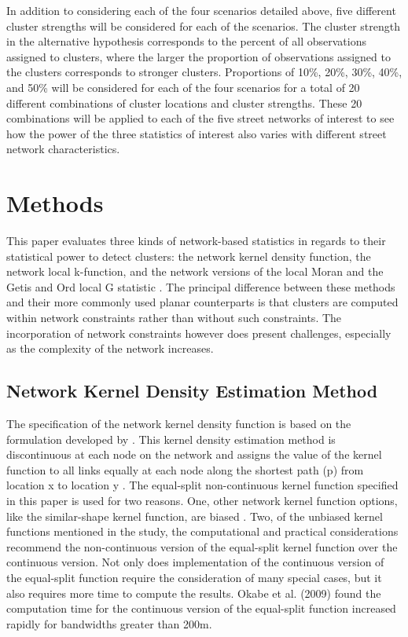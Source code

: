 \documentclass[12pt, letterpaper]{article}
\begin{document}
In addition to considering each of the four scenarios detailed above, five different cluster strengths will be considered for each of the scenarios. The cluster strength in the alternative hypothesis corresponds to the percent of all observations assigned to clusters, where the larger the proportion of observations assigned to the clusters corresponds to stronger clusters. Proportions of 10\%, 20\%, 30\%, 40\%, and 50\% will be considered for each of the four scenarios for a total of 20 different combinations of cluster locations and cluster strengths. These 20 combinations will be applied to each of the five street networks of interest to see how the power of the three statistics of interest also varies with different street network characteristics.  


\section{Methods}
This paper evaluates three kinds of network-based statistics in regards to their statistical power to detect clusters: the network kernel density function, the network local k-function, and the network versions of the local Moran \citep{Anselin 1995} and the Getis and Ord local G statistic \citep{getisord1992distance}. The principal difference between these methods and their more commonly used planar counterparts is that clusters are computed within network constraints rather than without such constraints. The incorporation of network constraints however does present challenges, especially as the complexity of the network increases. 

\subsection{Network Kernel Density Estimation Method}
The specification of the network kernel density function is based on the formulation developed by  \citep{okabe2009kernel}. This kernel density estimation method is discontinuous at each node on the network and assigns the value of the kernel function to all links equally at each node along the shortest path (p) from location x to location y \citep{okabe2009kernel}. The equal-split non-continuous kernel function specified in this paper is used for two reasons. One, other network kernel function options, like the similar-shape kernel function, are biased \citep{okabe2009kernel}. Two, of the unbiased kernel functions mentioned in the study, the computational and practical considerations recommend the non-continuous version of the equal-split kernel function over the continuous version. Not only does implementation of the continuous version of the equal-split function require the consideration of many special cases, but it also requires more time to compute the results. Okabe et al. (2009) found the computation time for the continuous version of the equal-split function increased rapidly for bandwidths greater than 200m.     
\end{document}
